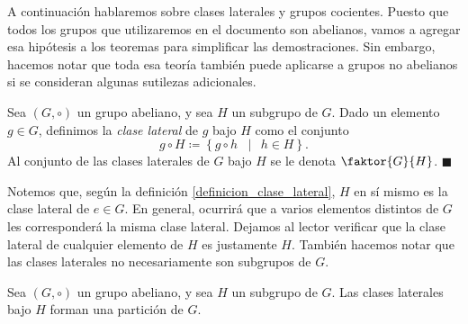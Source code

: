 A continuación hablaremos sobre clases laterales y grupos cocientes. Puesto que todos los grupos que utilizaremos en el documento son abelianos, vamos a agregar esa hipótesis a los teoremas para simplificar las demostraciones. Sin embargo, hacemos notar que toda esa teoría también puede aplicarse a grupos no abelianos si se consideran algunas sutilezas adicionales. 

\begin{definition} \label{definicion_clase_lateral}
Sea $(G, \circ)$ un grupo abeliano, y sea $H$ un subgrupo de $G$. Dado un elemento $g \in G$, definimos la \emph{clase lateral} de $g$ bajo $H$ como el conjunto
$$g \circ H \coloneq \left\{ g \circ h \;\; \mid \;\, h \in H \right\}.$$ Al conjunto de las clases laterales de $G$ bajo $H$ se le denota $\faktor{G}{H}$.
\hfill$\blacksquare$
\end{definition}

Notemos que, según la definición \ref{definicion_clase_lateral}, $H$ en sí mismo es la clase lateral de $e \in G$. En general, ocurrirá que a varios elementos distintos de $G$ les corresponderá la misma clase lateral. Dejamos al lector verificar que la clase lateral de cualquier elemento de $H$ es justamente $H$. También hacemos notar que las clases laterales no necesariamente son subgrupos de $G$.

\begin{prop} \label{lema:rel bin}
Sea $(G, \circ)$ un grupo abeliano, y sea $H$ un subgrupo de $G$. Las clases laterales bajo $H$ forman una partición de $G$.
\end{prop}

